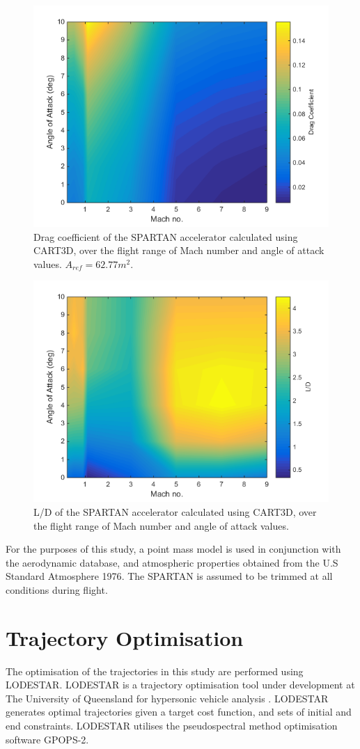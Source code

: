 \documentclass[journal]{new-aiaa} %
\begin{document}
 \begin{figure}
 	\centering
 	\includegraphics[width=0.6\linewidth]{Figures/Cd}
 	\vspace{-10pt}
 	\caption{Drag coefficient of the SPARTAN accelerator calculated using CART3D, over the flight range of Mach number and angle of attack values. $A_{ref} = 62.77m^2$.}
 	\label{fig:Cd}
 \end{figure}
 
 \begin{figure}
 	\centering
 	\includegraphics[width=0.6\linewidth]{Figures/LD}
 	\vspace{-10pt}
 	\caption{L/D of the SPARTAN accelerator calculated using CART3D, over the flight range of Mach number and angle of attack values. }
 	\label{fig:LD}
 \end{figure}
 
 
 
 For the purposes of this study, a point mass model is used in conjunction with the aerodynamic database, and atmospheric properties obtained from the U.S Standard Atmosphere 1976\cite{Administration1976}. The SPARTAN is assumed to be trimmed at all conditions during flight.
 

\section{Trajectory Optimisation}\label{sec:opt}
The optimisation of the trajectories in this study are performed using LODESTAR. LODESTAR is a trajectory optimisation tool under development at The University of Queensland for hypersonic vehicle analysis \cite{ForbesSpyratos2018}. LODESTAR generates optimal trajectories given a target cost function, and sets of initial and end constraints. LODESTAR utilises the pseudospectral method optimisation software GPOPS-2\cite{Patterson2015}. 
\end{document}
